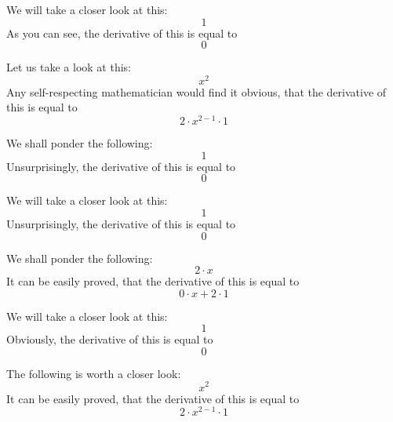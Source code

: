 \documentclass{article}
\begin{document}
We will take a closer look at this:
\begin{equation}
1 
\end{equation}
As you can see, the derivative of this is equal to
\begin{equation}
0 
\end{equation}

Let us take a look at this:
\begin{equation}
x ^{2 } 
\end{equation}
Any self-respecting mathematician would find it obvious, that the derivative of this is equal to
\begin{equation}
2 \cdot x ^{2 - 1 } \cdot 1 
\end{equation}

We shall ponder the following:
\begin{equation}
1 
\end{equation}
Unsurprisingly, the derivative of this is equal to
\begin{equation}
0 
\end{equation}

We will take a closer look at this:
\begin{equation}
1 
\end{equation}
Unsurprisingly, the derivative of this is equal to
\begin{equation}
0 
\end{equation}

We shall ponder the following:
\begin{equation}
2 \cdot x 
\end{equation}
It can be easily proved, that the derivative of this is equal to
\begin{equation}
0 \cdot x + 2 \cdot 1 
\end{equation}

We will take a closer look at this:
\begin{equation}
1 
\end{equation}
Obviously, the derivative of this is equal to
\begin{equation}
0 
\end{equation}

The following is worth a closer look:
\begin{equation}
x ^{2 } 
\end{equation}
It can be easily proved, that the derivative of this is equal to
\begin{equation}
2 \cdot x ^{2 - 1 } \cdot 1 
\end{equation}
\end{document}
